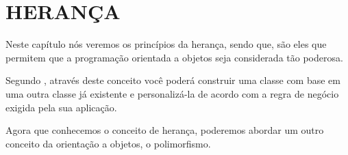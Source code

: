 \section{HERANÇA}

Neste capítulo nós veremos os princípios da herança, sendo que, são eles que
permitem que a programação orientada a objetos seja considerada tão poderosa.

Segundo , através deste conceito você poderá
construir uma classe com base em uma outra classe já existente e personalizá-la 
de acordo com a regra de negócio exigida pela sua aplicação.

Agora que conhecemos o conceito de herança, poderemos abordar um outro conceito
da orientação a objetos, o polimorfismo.
